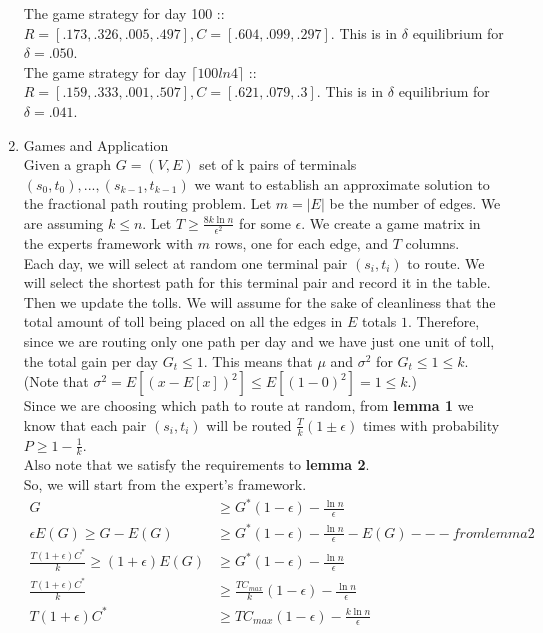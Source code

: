 \documentclass[a4paper]{article}
\begin{document}
\begin{enumerate}
The game strategy for day 100 :: $R = [.173, .326, .005, .497], C = [.604, .099, .297]$.  This is in $\delta$ equilibrium for $\delta = .050$.\\
The game strategy for day $\lceil 100 ln 4 \rceil$ :: $R = [.159, .333, .001, .507], C = [.621, .079, .3]$.  This is in $\delta$ equilibrium for $\delta = .041$.\\
\item Games and Application \\
Given a graph $G = (V, E)$ set of k pairs of terminals ${(s_0, t_0), ..., (s_{k-1}, t_{k-1})}$ we want to establish an approximate solution to the fractional path routing problem.  Let $m = |E|$ be the number of edges.  We are assuming $k \leq n$.  Let $T \geq \frac{8k \ln n}{\epsilon^2}$ for some $\epsilon$.  We create a game matrix in the experts framework with $m$ rows, one for each edge, and $T$ columns.\\
Each day, we will select at random one terminal pair $(s_i, t_i)$ to route.  We will select the shortest path for this terminal pair and record it in the table.  Then we update the tolls.  We will assume for the sake of cleanliness that the total amount of toll being placed on all the edges in $E$ totals $1$.  Therefore, since we are routing only one path per day and we have just one unit of toll, the total gain per day $G_t \leq 1$.  This means that $\mu$ and $\sigma ^2$ for $G_t \leq 1 \leq k$.  (Note that $\sigma ^2 = E[(x-E[x])^2] \leq E[(1 - 0) ^ 2] = 1 \leq k$.)\\
Since we are choosing which path to route at random, from \textbf{lemma 1} we know that each pair $(s_i, t_i)$ will be routed $\frac{T}{k}(1 \pm \epsilon)$ times with probability $P \geq 1 - \frac{1}{k}$.\\
Also note that we satisfy the requirements to \textbf{lemma 2}. \\
So, we will start from the expert's framework.\\
	\begin{align*}
		G &\geq G^*(1-\epsilon)-\frac{\ln n}{\epsilon}\\
		\epsilon E(G) \geq G - E(G) &\geq G^* (1-\epsilon) - \frac{\ln n}{\epsilon} - E(G) --- from lemma 2 \\
		\frac{T(1+\epsilon)C^*}{k} \geq (1+\epsilon) E(G) &\geq G^*(1-\epsilon)- \frac{\ln n}{\epsilon} \\
		\frac{T(1+\epsilon)C^*}{k} &\geq \frac{TC_{max}}{k}(1-\epsilon) - \frac{\ln n}{\epsilon} \\
		T(1+\epsilon)C^* &\geq TC_{max} (1-\epsilon) - \frac{k \ln n}{\epsilon} \\

\end{align*}
\end{enumerate}
\end{document}
